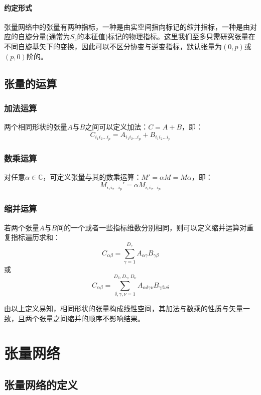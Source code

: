 \paragraph{约定形式}
张量网络中的张量有两种指标，一种是由实空间指向标记的缩并指标，一种是由对应的自旋分量(通常为$S_z$的本征值)标记的物理指标。这里我们至多只需研究张量在不同自旋基矢下的变换，因此可以不区分协变与逆变指标，默认张量为$(0,p)$或$(p,0)$阶的。

\subsection{张量的运算}

\subsubsection{加法运算}

两个相同形状的张量$A$与$B$之间可以定义加法：$C = A+B$，即：
\[
C_{i_1 i_2 \dots i_p} = A_{i_1 i_2 \dots i_p} + B_{i_1 i_2 \dots i_p}
\]


\subsubsection{数乘运算}

对任意$\alpha \in \mathbb{C}$，可定义张量与其的数乘运算：$M' = \alpha M = M \alpha$，即：
\[
M_{i_1 i_2 \dots i_p}' = \alpha M_{i_1 i_2 \dots i_p}
\]

\subsubsection{缩并运算}

若两个张量$A$与$B$间的一个或者一些指标维数分别相同，则可以定义缩并运算对重复指标遍历求和：
\[
C_{\alpha\beta} = \sum_{\gamma=1}^{D_\gamma} A_{\alpha\gamma} B_{\gamma\beta}
\]
或
\[
C_{\alpha\beta} = \sum_{\delta,\gamma,\nu=1}^{D_\delta,D_\gamma,D_\nu} A_{\alpha\delta\gamma\nu} B_{\gamma\beta\nu\delta}
\]

由以上定义易知，相同形状的张量构成线性空间，其加法与数乘的性质与矢量一致，且两个张量之间缩并的顺序不影响结果。

\section{张量网络}

\subsection{张量网络的定义}

